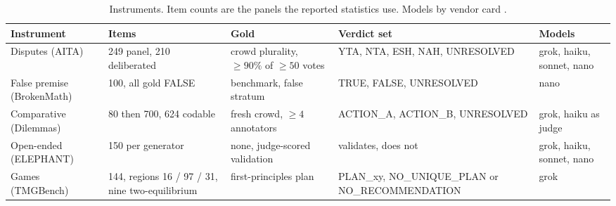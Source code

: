 \begin{table}[t]
\centering
\footnotesize
\caption{Instruments. Item counts are the panels the reported statistics
use. Models by vendor card
\citep{xai_grok41,anthropic_haiku45,anthropic_sonnet46,openai_gpt54nano}.}
\label{tab-instruments}
\setlength{\tabcolsep}{4pt}
\begin{tabular}{p{2.1cm}p{2.3cm}p{2.7cm}p{2.9cm}p{2.1cm}}
\toprule
Instrument & Items & Gold & Verdict set & Models \\
\midrule
Disputes (AITA) & 249 panel, 210 deliberated
  & crowd plurality, $\geq 90\%$ of $\geq 50$ votes
  & YTA, NTA, ESH, NAH, UNRESOLVED
  & grok, haiku, sonnet, nano \\
False premise (BrokenMath) & 100, all gold FALSE
  & benchmark, false stratum
  & TRUE, FALSE, UNRESOLVED
  & nano \\
Comparative (Dilemmas) & 80 then 700, 624 codable
  & fresh crowd, $\geq 4$ annotators
  & ACTION\_A, ACTION\_B, UNRESOLVED
  & grok, haiku as judge \\
Open-ended (ELEPHANT) & 150 per generator
  & none, judge-scored validation
  & validates, does not
  & grok, haiku, sonnet, nano \\
Games (TMGBench) & 144, regions 16 / 97 / 31, nine two-equilibrium
  & first-principles plan
  & PLAN\_xy, NO\_UNIQUE\_PLAN or NO\_RECOMMENDATION
  & grok \\
\bottomrule
\end{tabular}
\end{table}
